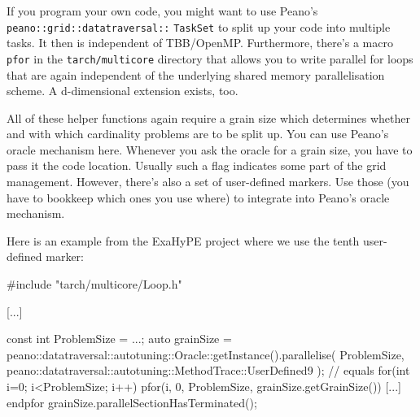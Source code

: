 \noindent
If you program your own code, you might want to use Peano's
\texttt{peano::grid::datatraversal::} \texttt{TaskSet} to split up your code
into multiple tasks. It then is independent of TBB/OpenMP. Furthermore, there's a macro
\texttt{pfor} in the \texttt{tarch/multicore} directory that allows you to write
parallel for loops that are again independent of the underlying shared memory
parallelisation scheme. A d-dimensional extension exists, too.

All of these helper functions again require a grain size which determines
whether and with which cardinality problems are to be split up.
You can use Peano's oracle mechanism here.
Whenever you ask the oracle for a grain size, you have to pass it the code
location.
Usually such a flag indicates some part of the grid management.
However, there's also a set of user-defined markers.
Use those (you have to bookkeep which ones you use where) to integrate into
Peano's oracle mechanism.

 
Here is an example from the ExaHyPE project where we use the tenth user-defined
marker:
\begin{code}
#include "tarch/multicore/Loop.h"

[...]

const int ProblemSize = ...;
auto grainSize = peano::datatraversal::autotuning::Oracle::getInstance().parallelise(
 ProblemSize,
 peano::datatraversal::autotuning::MethodTrace::UserDefined9
); 
// equals for(int i=0; i<ProblemSize; i++)
pfor(i, 0, ProblemSize, grainSize.getGrainSize())
  [...]
endpfor
grainSize.parallelSectionHasTerminated();
\end{code}




